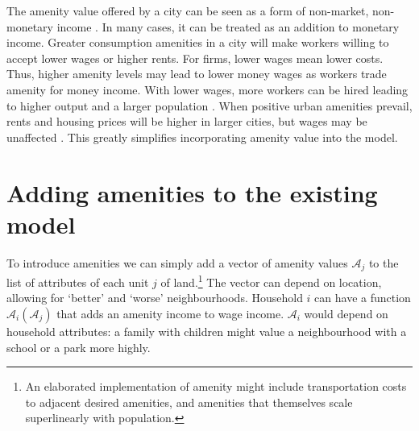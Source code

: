 The \gls{amenity} value offered by a city can be seen as a form of non-market, non-monetary income \cite{kaufmannScalingUrbanAmenities2022}. In many cases, it can be treated as an addition to monetary income.  Greater consumption amenities in a city will make workers willing to accept lower wages or higher rents. For firms,  lower wages mean lower costs. Thus,  higher amenity levels may lead to lower money wages as workers trade amenity for money income. With lower wages, more workers can be hired leading to higher output and a larger population \cite{pugaMagnitudeCausesAgglomeration2010}. 
When positive urban amenities prevail, rents and housing prices will be higher in larger cities, but wages may be unaffected \cite{robackWagesRentsAmenities1988, dalmazzoAmenitiesSkillbiasedAgglomeration2011}. This greatly simplifies incorporating amenity value into the model.





\section{Adding amenities to the existing model}
To introduce amenities we can simply add a vector of amenity values $\mathcal{A}_j$ to the list of attributes of each unit $j$ of land.\footnote{An elaborated implementation of amenity might include transportation costs to adjacent desired amenities, and amenities that themselves scale superlinearly with population.} 
The vector can depend on location, allowing for `better' and `worse' neighbourhoods.  Household $i$ can have a function $\mathcal{A}_i (\mathcal{A}_j)$ that adds an amenity income to wage income. $\mathcal{A}_i$  would depend on household attributes: a family with children might value a neighbourhood with a school or a park more highly. 


